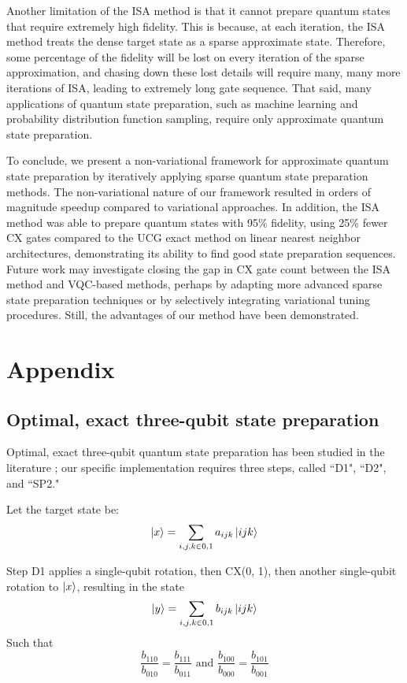 \documentclass{article}
\begin{document}
Another limitation of the ISA method is that it cannot prepare quantum states
that require extremely high fidelity. This is because, at each iteration, the
ISA method treats the dense target state as a sparse approximate state.
Therefore, some percentage of the fidelity will be lost on every iteration of
the sparse approximation, and chasing down these lost details will require many,
many more iterations of ISA, leading to extremely long gate sequence. That said,
many applications of quantum state preparation, such as machine learning and 
probability distribution function sampling, require only approximate quantum
state preparation.

To conclude, we present a non-variational framework for approximate quantum 
state preparation by iteratively applying sparse quantum state preparation
methods. The non-variational nature of our framework resulted in orders of
magnitude speedup compared to variational approaches. In addition, the ISA
method was able to prepare quantum states with 95\% fidelity, using 25\% 
fewer CX gates compared to the UCG exact method on linear nearest neighbor 
architectures, demonstrating its ability to find good state preparation 
sequences. Future work may investigate closing the gap in CX gate count between
the ISA method and VQC-based methods, perhaps by adapting more advanced sparse
state preparation techniques or by selectively integrating variational tuning
procedures. Still, the advantages of our method have been demonstrated.

\section{Appendix}

\subsection{Optimal, exact three-qubit state preparation}
Optimal, exact three-qubit quantum state preparation has been studied in the
literature \cite{PhysRevA.77.032320}; our specific implementation requires
three steps, called ``D1", ``D2", and ``SP2."

Let the target state be:
$$\mathinner{|{x}\rangle} = \sum_{i, j, k \in {0, 1}}{a_{ijk}\mathinner{|{ijk}\rangle}}$$

Step D1 applies a single-qubit rotation, then CX(0, 1), then another
single-qubit rotation to $\mathinner{|{x}\rangle}$, resulting in the state
$$\mathinner{|{y}\rangle} = \sum_{i, j, k \in {0, 1}}{b_{ijk}\mathinner{|{ijk}\rangle}}$$
Such that
$$\frac{b_{110}}{b_{010}} = \frac{b_{111}}{b_{011}} 
  \text{ and } \frac{b_{100}}{b_{000}} = \frac{b_{101}}{b_{001}}$$
\end{document}
